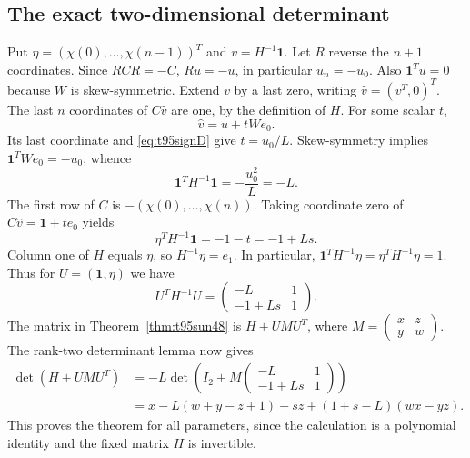 \documentclass[11pt,a4paper]{article}
\theoremstyle{definition}
\theoremstyle{remark}
\begin{document}
\subsection{The exact two-dimensional determinant}
Put $\eta=(\chi(0),\ldots,\chi(n-1))^T$ and $v=H^{-1}\mathbf1$.
Let $R$ reverse the $n+1$ coordinates. Since $RCR=-C$,
$Ru=-u$, in particular $u_n=-u_0$. Also
$\mathbf1^Tu=0$ because $W$ is skew-symmetric.
Extend $v$ by a last zero, writing $\widehat v=(v^T,0)^T$. The last
$n$ coordinates of $C\widehat v$ are one, by the definition of $H$.
For some scalar $t$,
\[
 \widehat v=u+tWe_0.
\]
Its last coordinate and \eqref{eq:t95signD} give $t=u_0/L$.
Skew-symmetry implies $\mathbf1^TWe_0=-u_0$, whence
\begin{equation}\label{eq:t95inverseentries}
 \mathbf1^TH^{-1}\mathbf1=-\frac{u_0^2}{L}=-L.
\end{equation}
The first row of $C$ is
$-(\chi(0),\ldots,\chi(n))$. Taking coordinate zero of
$C\widehat v=\mathbf1+te_0$ yields
\[
 \eta^TH^{-1}\mathbf1=-1-t=-1+Ls.
\]
Column one of $H$ equals $\eta$, so
$H^{-1}\eta=e_1$. In particular,
$\mathbf1^TH^{-1}\eta=\eta^TH^{-1}\eta=1$.
Thus for $U=(\mathbf1,\eta)$ we have
\[
 U^TH^{-1}U=
 \begin{pmatrix}-L&1\\-1+Ls&1\end{pmatrix}.
\]
The matrix in Theorem~\ref{thm:t95sun48} is
$H+UMU^T$, where $M=\left(\begin{smallmatrix}x&z\\y&w\end{smallmatrix}\right)$.
The rank-two determinant lemma now gives
\begin{align*}
 \det(H+UMU^T)
 &=-L\det\left(I_2+M
          \begin{pmatrix}-L&1\\-1+Ls&1\end{pmatrix}\right)\\
 &=x-L(w+y-z+1)-sz+(1+s-L)(wx-yz).
\end{align*}
This proves the theorem for all parameters, since the calculation is a
polynomial identity and the fixed matrix $H$ is invertible.
\end{document}
